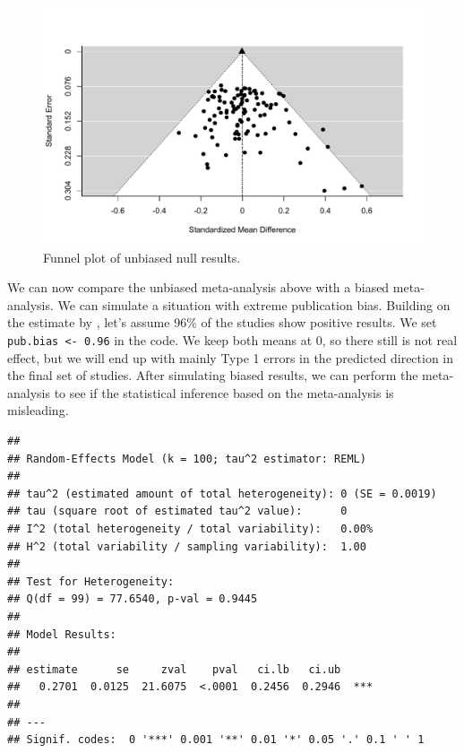 \documentclass[
  oneside]{krantz}
\begin{document}
\begin{figure}

{\centering \includegraphics[width=1\linewidth]{12-bias_files/figure-latex/funnel1-1} 

}

\caption{Funnel plot of unbiased null results.}\label{fig:funnel1}
\end{figure}

We can now compare the unbiased meta-analysis above with a biased meta-analysis. We can simulate a situation with extreme publication bias. Building on the estimate by \citet{scheel_excess_2021}, let's assume 96\% of the studies show positive results. We set \texttt{pub.bias\ \textless{}-\ 0.96} in the code. We keep both means at 0, so there still is not real effect, but we will end up with mainly Type 1 errors in the predicted direction in the final set of studies. After simulating biased results, we can perform the meta-analysis to see if the statistical inference based on the meta-analysis is misleading.

\begin{verbatim}
## 
## Random-Effects Model (k = 100; tau^2 estimator: REML)
## 
## tau^2 (estimated amount of total heterogeneity): 0 (SE = 0.0019)
## tau (square root of estimated tau^2 value):      0
## I^2 (total heterogeneity / total variability):   0.00%
## H^2 (total variability / sampling variability):  1.00
## 
## Test for Heterogeneity:
## Q(df = 99) = 77.6540, p-val = 0.9445
## 
## Model Results:
## 
## estimate      se     zval    pval   ci.lb   ci.ub     ​ 
##   0.2701  0.0125  21.6075  <.0001  0.2456  0.2946  *** 
## 
## ---
## Signif. codes:  0 '***' 0.001 '**' 0.01 '*' 0.05 '.' 0.1 ' ' 1
\end{verbatim}
\end{document}
